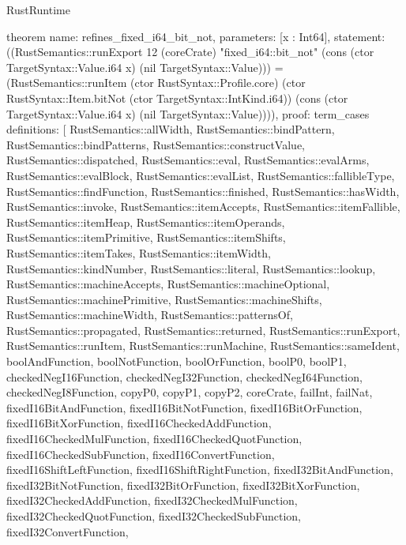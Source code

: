 \begin{lexlean}{RustRuntime}
\begin{semanticmodule}
theorem{
  name: refines_fixed_i64_bit_not,
  parameters: [x : Int64],
  statement: ((RustSemantics::runExport 12 (coreCrate) "fixed_i64::bit_not" (cons (ctor TargetSyntax::Value.i64 x) (nil TargetSyntax::Value))) = (RustSemantics::runItem (ctor RustSyntax::Profile.core) (ctor RustSyntax::Item.bitNot (ctor TargetSyntax::IntKind.i64)) (cons (ctor TargetSyntax::Value.i64 x) (nil TargetSyntax::Value)))),
  proof: term_cases{
    definitions: [
      RustSemantics::allWidth,
      RustSemantics::bindPattern,
      RustSemantics::bindPatterns,
      RustSemantics::constructValue,
      RustSemantics::dispatched,
      RustSemantics::eval,
      RustSemantics::evalArms,
      RustSemantics::evalBlock,
      RustSemantics::evalList,
      RustSemantics::fallibleType,
      RustSemantics::findFunction,
      RustSemantics::finished,
      RustSemantics::hasWidth,
      RustSemantics::invoke,
      RustSemantics::itemAccepts,
      RustSemantics::itemFallible,
      RustSemantics::itemHeap,
      RustSemantics::itemOperands,
      RustSemantics::itemPrimitive,
      RustSemantics::itemShifts,
      RustSemantics::itemTakes,
      RustSemantics::itemWidth,
      RustSemantics::kindNumber,
      RustSemantics::literal,
      RustSemantics::lookup,
      RustSemantics::machineAccepts,
      RustSemantics::machineOptional,
      RustSemantics::machinePrimitive,
      RustSemantics::machineShifts,
      RustSemantics::machineWidth,
      RustSemantics::patternsOf,
      RustSemantics::propagated,
      RustSemantics::returned,
      RustSemantics::runExport,
      RustSemantics::runItem,
      RustSemantics::runMachine,
      RustSemantics::sameIdent,
      boolAndFunction,
      boolNotFunction,
      boolOrFunction,
      boolP0,
      boolP1,
      checkedNegI16Function,
      checkedNegI32Function,
      checkedNegI64Function,
      checkedNegI8Function,
      copyP0,
      copyP1,
      copyP2,
      coreCrate,
      failInt,
      failNat,
      fixedI16BitAndFunction,
      fixedI16BitNotFunction,
      fixedI16BitOrFunction,
      fixedI16BitXorFunction,
      fixedI16CheckedAddFunction,
      fixedI16CheckedMulFunction,
      fixedI16CheckedQuotFunction,
      fixedI16CheckedSubFunction,
      fixedI16ConvertFunction,
      fixedI16ShiftLeftFunction,
      fixedI16ShiftRightFunction,
      fixedI32BitAndFunction,
      fixedI32BitNotFunction,
      fixedI32BitOrFunction,
      fixedI32BitXorFunction,
      fixedI32CheckedAddFunction,
      fixedI32CheckedMulFunction,
      fixedI32CheckedQuotFunction,
      fixedI32CheckedSubFunction,
      fixedI32ConvertFunction,
}}
\end{semanticmodule}
\end{lexlean}
